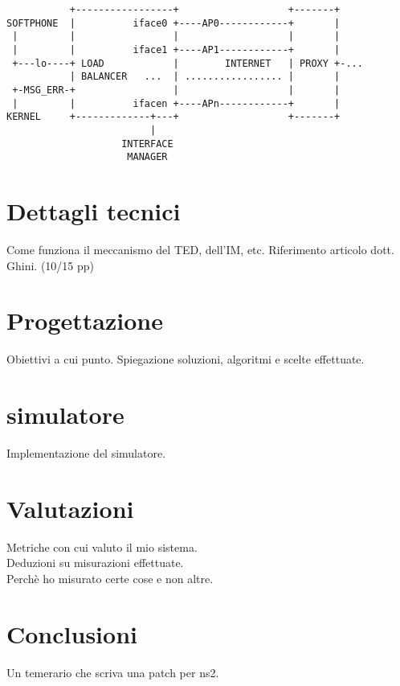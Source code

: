 \documentclass[12pt,a4paper,openright,twoside]{book}
\begin{document}
	\begin{verbatim}
           +-----------------+                   +-------+
SOFTPHONE  |          iface0 +----AP0------------+       |
 |         |                 |                   |       |
 |         |          iface1 +----AP1------------+       |
 +---lo----+ LOAD            |        INTERNET   | PROXY +-...
           | BALANCER   ...  | ................. |       |
 +-MSG_ERR-+                 |                   |       |
 |         |          ifacen +----APn------------+       |
KERNEL     +-------------+---+                   +-------+
                         |
                    INTERFACE
                     MANAGER
\end{verbatim}

\chapter{Dettagli tecnici}

	Come funziona il meccanismo del TED, dell'IM, etc. Riferimento articolo
	dott. Ghini. (10/15 pp)

\chapter{Progettazione}

	Obiettivi a cui punto. Spiegazione soluzioni, algoritmi e scelte effettuate.

\chapter{simulatore}

	Implementazione del simulatore.

\chapter{Valutazioni}

	Metriche con cui valuto il mio sistema.\\
	Deduzioni su misurazioni effettuate.\\
	Perchè ho misurato certe cose e non altre.

\chapter*{Conclusioni}

	Un temerario che scriva una patch per ns2.
\end{document}

